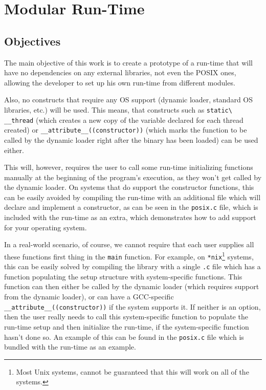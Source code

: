 \chapter{Modular Run-Time}
\section{Objectives}

The main objective of this work is to create a prototype of a run-time that will have no dependencies on any external libraries, not even the POSIX ones, allowing the developer to set up his own run-time from different modules.

Also, no constructs that require any OS support (dynamic loader, standard OS libraries, etc.) will be used. This means, that constructs such as \verb=static\ __thread= (which creates a new copy of the variable declared for each thread created) or \newline{} \verb=__attribute__((constructor))= (which marks the function to be called by the dynamic loader right after the binary has been loaded) can be used either.

This will, however, requires the user to call some run-time initializing functions manually at the beginning of the program's execution, as they won't get called by the dynamic loader. On systems that do support the constructor functions, this can be easily avoided by compiling the run-time with an additional file which will declare and implement a constructor, as can be seen in the \verb=posix.c= file, which is included with the run-time as an extra, which demonstrates how to add support for your operating system.

In a real-world scenario, of course, we cannot require that each user supplies all these functions first thing in the \verb=main= function. For example, on \verb=*nix=\footnote{Most Unix systems, cannot be guaranteed that this will work on all of the systems.} systems, this can be easily solved by compiling the library with a single \verb=.c= file which has a function populating the setup structure with system-specific functions. This function can then either be called by the dynamic loader (which requires support from the dynamic loader), or can have a GCC-specific \verb=__attribute__((constructor))= if the system supports it. If neither is an option, then the user really needs to call this system-specific function to populate the run-time setup and then initialize the run-time, if the system-specific function hasn't done so. An example of this can be found in the \verb=posix.c= file which is bundled with the run-time as an example.


